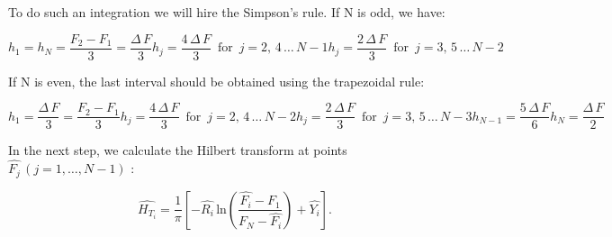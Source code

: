 \documentclass[12pt,twoside,a4paper]{article}
\numberwithin{equation}{subsection}
\numberwithin{figure}{subsection}
\begin{document}
To do such an integration we will hire the Simpson's rule. If N is odd, we have:

\begin{subequations} \label{eq:htran_nodd}
  \begin{equation}   \label{eq:hnodd_fnlast}
    h_1 = h_N = \frac {F_2 - F_1}{3} = \frac {\Delta \, F}{3}
  \end{equation}
  \begin{equation}   \label{eq:hnodd_even}
    h_j = \frac {4 \, \Delta \, F}{3}  \, \mbox{ for } \, j = 2, \, 4 \, \ldots \, {N - 1}
  \end{equation}
  \begin{equation}   \label{eq:hnodd_odd}
    h_j = \frac {2 \, \Delta \, F}{3}  \, \mbox{ for } \, j = 3, \, 5 \, \ldots \, {N - 2}
  \end{equation}
\end{subequations}

If N is even, the last interval should be obtained using the trapezoidal rule:

\begin{subequations} \label{eq:htran_neven}
  \begin{equation}   \label{eq:hneven_first}
    h_1 = \frac {\Delta \, F}{3} = \frac {F_2 - F_1}{3}
  \end{equation}
  \begin{equation}   \label{eq:hneven_even}
    h_j = \frac {4 \, \Delta \, F}{3}  \, \mbox{ for } \, j = 2, \, 4 \, \ldots \, {N - 2}
  \end{equation}
  \begin{equation}   \label{eq:hneven_odd}
    h_j = \frac {2 \, \Delta \, F}{3}  \, \mbox{ for } \, j = 3, \, 5 \, \ldots \, {N - 3}
  \end{equation}
   \begin{equation}   \label{eq:hneven_prelast}
    h_{N - 1} = \frac {5 \, \Delta \, F}{6}
  \end{equation}
   \begin{equation}   \label{eq:hneven_last}
    h_N = \frac {\Delta \, F}{2}
  \end{equation}
\end{subequations}

In the next step, we calculate the Hilbert transform at points $\widehat{F_j} \, (j = 1, \ldots, N-1)$ :  

\begin{equation} \label{eq:htran_htpoints}
  \widehat{H_{T_i}} = \frac {1}{\pi} 
  \left[ -  \widehat{R_i}
         \, \mathrm{ln}(\frac {\widehat{F_i} - F_1}{F_N - \widehat{F_i} })
         +  \widehat{Y_i} 
  \right].
\end{equation}
\end{document}
